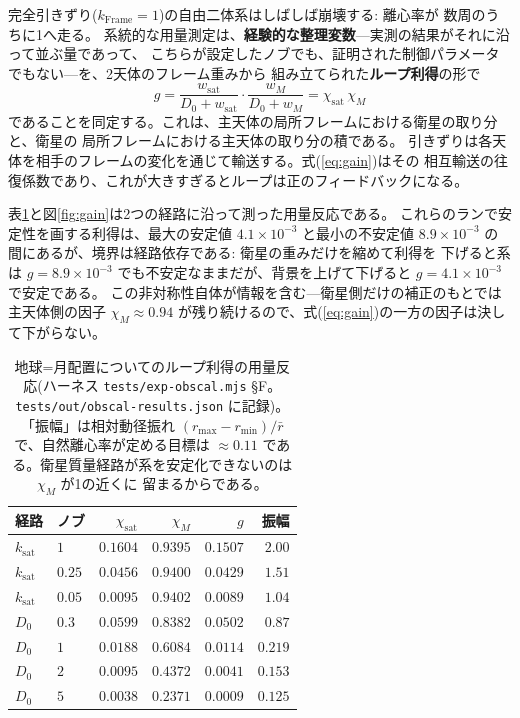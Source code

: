 \documentclass[a4paper,10pt,twocolumn]{ltjsarticle}
\begin{document}
完全引きずり($k_{\mathrm{Frame}}=1$)の自由二体系はしばしば崩壊する: 離心率が
数周のうちに1へ走る。
系統的な用量測定は、\textbf{経験的な整理変数}---実測の結果がそれに沿って並ぶ量であって、
こちらが設定したノブでも、証明された制御パラメータでもない---を、2天体のフレーム重みから
組み立てられた\textbf{ループ利得}の形で
\begin{equation}
  g = \frac{w_{\mathrm{sat}}}{D_0+w_{\mathrm{sat}}}\cdot
      \frac{w_{M}}{D_0+w_{M}}
    = \chi_{\mathrm{sat}}\,\chi_{M}
  \label{eq:gain}
\end{equation}
であることを同定する。これは、主天体の局所フレームにおける衛星の取り分と、衛星の
局所フレームにおける主天体の取り分の積である。
引きずりは各天体を相手のフレームの変化を通じて輸送する。式(\ref{eq:gain})はその
相互輸送の往復係数であり、これが大きすぎるとループは正のフィードバックになる。

表\ref{tab:gain}と図\ref{fig:gain}は2つの経路に沿って測った用量反応である。
これらのランで安定性を画する利得は、最大の安定値 $4.1\times10^{-3}$ と最小の不安定値
$8.9\times10^{-3}$ の間にあるが、境界は経路依存である: 衛星の重みだけを縮めて利得を
下げると系は $g=8.9\times10^{-3}$ でも不安定なままだが、背景を上げて下げると
$g=4.1\times10^{-3}$ で安定である。
この非対称性自体が情報を含む---衛星側だけの補正のもとでは主天体側の因子
$\chi_M\approx0.94$ が残り続けるので、式(\ref{eq:gain})の一方の因子は決して下がらない。

\begin{table}[t]
\centering
\caption{地球=月配置についてのループ利得の用量反応(ハーネス
  \texttt{tests/exp-obscal.mjs} \S F。\texttt{tests/out/obscal-results.json} に記録)。
  「振幅」は相対動径振れ $(r_{\max}-r_{\min})/\bar r$ で、自然離心率が定める目標は
  $\approx0.11$ である。衛星質量経路が系を安定化できないのは $\chi_M$ が1の近くに
  留まるからである。}
\label{tab:gain}
\begin{tabular}{llrrrr}
\toprule
経路 & ノブ & $\chi_{\mathrm{sat}}$ & $\chi_{M}$ & $g$ & 振幅 \\
\midrule
$k_{\mathrm{sat}}$ & $1$    & $0.1604$ & $0.9395$ & $0.1507$ & $2.00$ \\
$k_{\mathrm{sat}}$ & $0.25$ & $0.0456$ & $0.9400$ & $0.0429$ & $1.51$ \\
$k_{\mathrm{sat}}$ & $0.05$ & $0.0095$ & $0.9402$ & $0.0089$ & $1.04$ \\
$D_0$ & $0.3$ & $0.0599$ & $0.8382$ & $0.0502$ & $0.87$ \\
$D_0$ & $1$   & $0.0188$ & $0.6084$ & $0.0114$ & $0.219$ \\
$D_0$ & $2$   & $0.0095$ & $0.4372$ & $0.0041$ & $0.153$ \\
$D_0$ & $5$   & $0.0038$ & $0.2371$ & $0.0009$ & $0.125$ \\
\bottomrule
\end{tabular}
\end{table}
\end{document}
